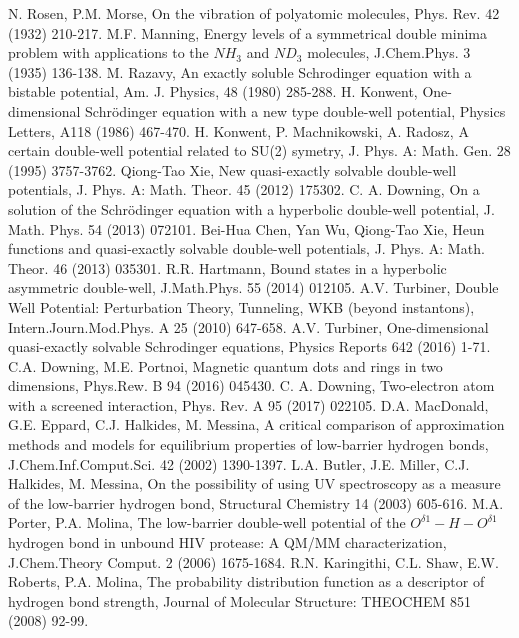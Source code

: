 \documentclass[singlespacing]{elsart}
\begin{document}
\newpage
\begin{thebibliography}{00}
N. Rosen, P.M. Morse, On the vibration of polyatomic molecules, Phys. Rev. 42 (1932) 210-217.
M.F. Manning, Energy levels of a symmetrical double minima problem with applications to the $NH_3$ and $ND_3$ molecules, J.Chem.Phys. 3 (1935) 136-138.
M. Razavy, An exactly soluble Schrodinger equation with a bistable potential, Am. J. Physics,  48 (1980) 285-288.
H. Konwent, One-dimensional Schr\"odinger equation with a new type double-well potential, Physics Letters, A118 (1986) 467-470.
H. Konwent, P. Machnikowski, A. Radosz, A certain double-well potential related to SU(2) symetry, J. Phys. A: Math. Gen. 28 (1995) 3757-3762.
Qiong-Tao Xie, New quasi-exactly solvable double-well potentials, J. Phys. A: Math. Theor. 45 (2012) 175302.
C. A. Downing, On a solution of the Schr\"odinger equation with a hyperbolic double-well potential, J. Math. Phys. 54 (2013) 072101.
Bei-Hua Chen, Yan Wu, Qiong-Tao Xie, Heun functions and quasi-exactly solvable double-well
potentials, J. Phys. A: Math. Theor. 46 (2013) 035301.
R.R. Hartmann, Bound states in a hyperbolic asymmetric double-well, J.Math.Phys. 55 (2014) 012105.
A.V. Turbiner, Double Well Potential: Perturbation Theory, Tunneling, WKB (beyond instantons),
Intern.Journ.Mod.Phys. A 25 (2010) 647-658.
A.V. Turbiner, One-dimensional quasi-exactly solvable Schrodinger equations, Physics Reports 642 (2016) 1-71.
C.A. Downing, M.E. Portnoi, Magnetic quantum dots and rings in two dimensions, Phys.Rew. B 94 (2016) 045430.
C. A. Downing, Two-electron atom with a screened interaction, Phys. Rev. A 95 (2017) 022105.
D.A. MacDonald, G.E. Eppard, C.J. Halkides, M. Messina, A critical comparison of approximation methods and models for equilibrium properties of low-barrier hydrogen bonds, J.Chem.Inf.Comput.Sci. 42 (2002) 1390-1397.
L.A. Butler, J.E. Miller, C.J. Halkides, M. Messina, On the possibility of using UV spectroscopy as a measure
of the low-barrier hydrogen bond, Structural Chemistry 14 (2003) 605-616.
M.A. Porter, P.A. Molina, The low-barrier double-well potential of the $O^{\delta 1}-H-O^{\delta 1}$
hydrogen bond in unbound HIV protease: A QM/MM characterization, J.Chem.Theory Comput.  2 (2006) 1675-1684.
R.N. Karingithi, C.L. Shaw, E.W. Roberts, P.A. Molina, The probability distribution function as a descriptor of hydrogen bond strength, Journal of Molecular Structure: THEOCHEM  851 (2008) 92-99.

\end{thebibliography}
\end{document}
